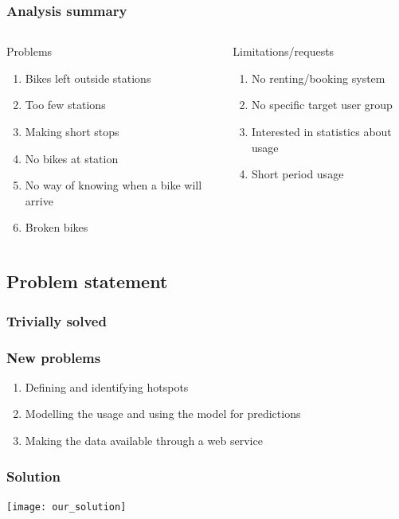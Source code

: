 \begin{frame}
\frametitle{Analysis summary}
\begin{columns}
\begin{column}{.45\textwidth}
\begin{block}{Problems\footnotemark}
\begin{enumerate}
\item Bikes left outside stations
\item Too few stations
\item Making short stops
\item No bikes at station
\item No way of knowing when a bike will arrive
\item Broken bikes
\end{enumerate}
\end{block}
\end{column}
\begin{column}{.45\textwidth}
\begin{block}{Limitations/requests\footnotemark[1]}
\begin{enumerate}
\item No renting/booking system
\item No specific target user group
\item Interested in statistics about usage
\item Short period usage
\end{enumerate}
\end{block}
\end{column}
\end{columns}
\end{frame}

\subsection{Problem statement}

\begin{frame}
\frametitle{Trivially solved}

\end{frame}

\begin{frame}
\frametitle{New problems}
\begin{enumerate}
\item Defining and identifying hotspots
\item Modelling the usage and using the model for predictions
\item Making the data available through a web service
\end{enumerate}
\end{frame}

\begin{frame}
\frametitle{Solution}

\centering
\texttt{[image: our\_solution]}

\end{frame}